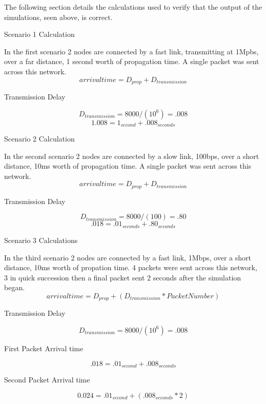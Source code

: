 \documentclass[12pt]{article}
\begin{document}
The following section details the calculations used to verify that the output of the simulations, seen above, is correct. 

\centerline{Scenario 1 Calculation}
In the first scenario 2 nodes are connected by a fast link, transmitting at 1Mpbs, over a far distance, 1 second worth of propagation time. A single packet was sent across this network.
\begin{equation}
arrival time = D_{prop} + D_{transmission}
\end{equation}
\centerline{Transmission Delay}
\begin{equation}
D_{transmission} = 8000 / (10^6) = .008
\end{equation}
\begin{equation}
1.008 = 1_{second} + .008_{seconds}
\end{equation}


\centerline{Scenario 2 Calculation}
In the second scenario 2 nodes are connected by a slow link, 100bps, over a short distance, 10ms worth of propagation time. A single packet was sent across this network.
\begin{equation}
arrival time = D_{prop} + D_{transmission}
\end{equation}
\centerline{Transmission Delay}
\begin{equation}
D_{transmission} = 8000 / (100) = .80
\end{equation}
\begin{equation}
.018 = .01_{seconds} + .80_{seconds}
\end{equation}

\centerline{Scenario 3 Calculations}
In the third scenario 2 nodes are connected by a fast link, 1Mbps, over a short distance, 10ms worth of propation time. 4 packets were sent across this network, 3 in quick succession then a final packet sent 2 seconds after the simulation began.
\begin{equation}
arrival time = D_{prop} + (D_{transmission} * Packet Number)
\end{equation}
\centerline{Transmission Delay}
\begin{equation}
D_{transmission} = 8000 / (10^6) = .008
\end{equation}

\centerline{First Packet Arrival time}
\begin{equation}
 .018 = .01_{second} + .008_{seconds}
\end{equation}

\centerline{Second Packet Arrival time}
\begin{equation}
  0.024 = .01_{second} + (.008_{seconds} * 2)
\end{equation}
\end{document}

